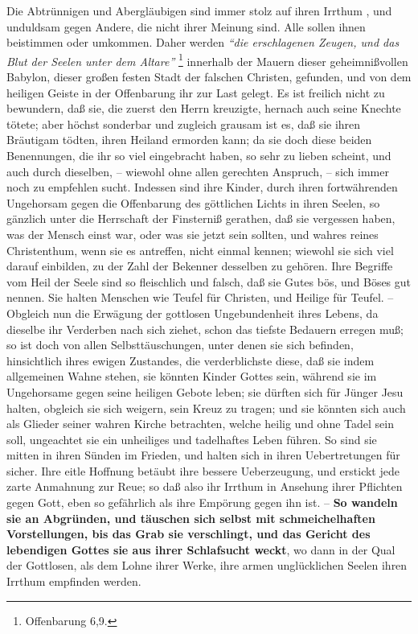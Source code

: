 Die Abtrünnigen und Abergläubigen sind immer stolz auf ihren Irrthum , und
unduldsam gegen Andere, die nicht ihrer Meinung sind.
Alle sollen ihnen beistimmen oder umkommen.
Daher werden
\textit{"`die erschlagenen Zeugen, und das Blut der Seelen unter
dem Altare"'}
\footnote{Offenbarung 6,9.}
innerhalb der Mauern dieser geheimnißvollen Babylon, dieser großen festen Stadt
der falschen Christen, gefunden, und von dem heiligen Geiste in der Offenbarung
ihr zur Last gelegt.
Es ist freilich nicht zu bewundern, daß sie, die zuerst den Herrn kreuzigte,
hernach auch seine Knechte tötete;
aber höchst sonderbar und zugleich grausam ist es, daß sie ihren Bräutigam
tödten, ihren Heiland ermorden kann;
da sie doch diese beiden Benennungen, die ihr so viel eingebracht haben, so sehr
zu lieben scheint, und auch durch dieselben,
-- wiewohl ohne allen gerechten Anspruch, --
sich immer noch zu empfehlen sucht.
Indessen sind ihre Kinder, durch ihren fortwährenden Ungehorsam gegen die
Offenbarung des göttlichen Lichts in ihren Seelen, so gänzlich unter die
Herrschaft der Finsterniß gerathen, daß sie vergessen haben, was der Mensch
einst war, oder was sie jetzt sein sollten, und wahres reines Christenthum, wenn
sie es antreffen, nicht einmal kennen;
wiewohl sie sich viel darauf einbilden, zu der Zahl der Bekenner desselben zu
gehören.
Ihre Begriffe vom Heil der Seele sind so fleischlich und falsch, daß sie Gutes
bös, und Böses gut nennen.
Sie halten Menschen wie Teufel für Christen, und Heilige für Teufel.
-- Obgleich nun die Erwägung der gottlosen Ungebundenheit ihres Lebens, da
dieselbe ihr Verderben nach sich ziehet, schon das tiefste Bedauern erregen muß;
so ist doch von allen Selbsttäuschungen, unter denen sie sich befinden,
hinsichtlich ihres ewigen Zustandes, die verderblichste diese, daß sie indem
allgemeinen Wahne stehen, sie könnten Kinder Gottes sein, während sie im
Ungehorsame gegen seine heiligen Gebote leben;
sie dürften sich für Jünger Jesu halten, obgleich sie sich weigern, sein Kreuz
zu tragen; und sie könnten sich auch als Glieder seiner wahren Kirche
betrachten, welche heilig und ohne Tadel sein soll, ungeachtet sie ein
unheiliges und tadelhaftes Leben führen.
So sind sie mitten in ihren Sünden im Frieden, und halten sich in ihren
Uebertretungen für sicher.
Ihre eitle Hoffnung betäubt ihre bessere Ueberzeugung, und erstickt jede zarte
Anmahnung zur Reue;
so daß also ihr Irrthum in Ansehung ihrer Pflichten gegen Gott, eben so
gefährlich als ihre Empörung gegen ihn ist.
-- \textbf{So wandeln sie an Abgründen, und täuschen sich selbst mit
schmeichelhaften Vorstellungen, bis das Grab sie verschlingt, und das
Gericht des lebendigen
Gottes sie aus ihrer Schlafsucht weckt}, wo dann in der Qual der Gottlosen, als
dem Lohne ihrer Werke, ihre armen unglücklichen Seelen ihren Irrthum empfinden
werden.

